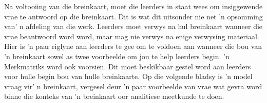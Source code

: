 Na voltooiing van die breinkaart, moet die leerders in staat wees om
insiggewende vrae te antwoord op die breinkaart. Dit is wat dit uitsonder
nie net 'n opsomming van' n afdeling van die werk. Leerders moet
verwys na hul breinkaart wanneer die vrae beantwoord word word, maar mag
nie verwys na enige verwysing materiaal. Hier is 'n paar riglyne aan
leerders te gee om te voldoen aan wanneer die bou van 'n breinkaart
sowel as twee voorbeelde om jou te help leerders begin. 'n Merkmatriks
word ook voorsien. Dit moet beskikbaar gestel word aan leerders voor
hulle begin bou van hulle breinkaarte. Op die volgende bladsy is 'n
model vraag vir' n breinkaart, vergesel deur 'n paar voorbeelde van
vrae wat gevra word binne die konteks van 'n breinkaart oor analitiese
meetkunde te doen.

